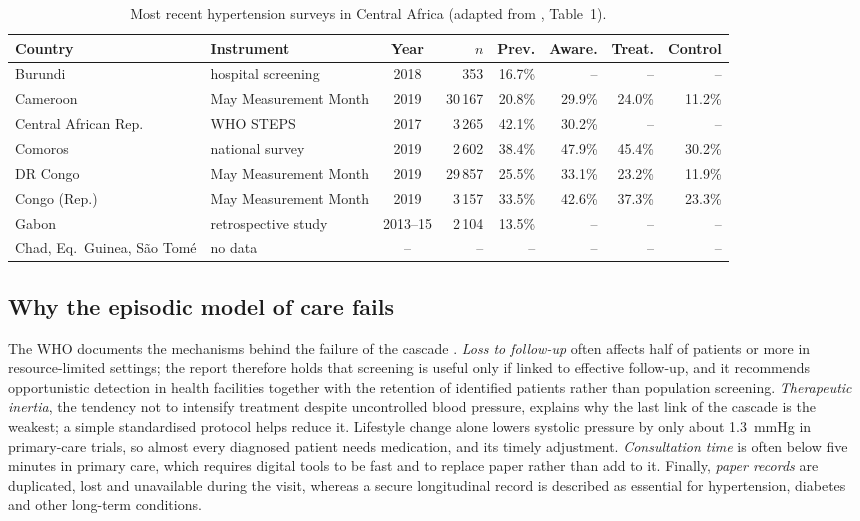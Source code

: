 \documentclass[11pt,a4paper,oneside]{report}
\begin{document}
\begin{table}[htbp]
\centering\footnotesize
\caption{Most recent hypertension surveys in Central Africa (adapted from \cite{gafane2024}, Table~1).}\label{tab:central-africa}
\begin{tabularx}{\textwidth}{@{}l >{\raggedright\arraybackslash}X c r r r r r@{}}
\toprule
\textbf{Country} & \textbf{Instrument} & \textbf{Year} & \textbf{$n$} & \textbf{Prev.} & \textbf{Aware.} & \textbf{Treat.} & \textbf{Control} \\
\midrule
Burundi & hospital screening & 2018 & 353 & 16.7\% & -- & -- & -- \\
Cameroon & May Measurement Month & 2019 & 30\,167 & 20.8\% & 29.9\% & 24.0\% & 11.2\% \\
Central African Rep. & WHO STEPS & 2017 & 3\,265 & 42.1\% & 30.2\% & -- & -- \\
Comoros & national survey & 2019 & 2\,602 & 38.4\% & 47.9\% & 45.4\% & 30.2\% \\
DR Congo & May Measurement Month & 2019 & 29\,857 & 25.5\% & 33.1\% & 23.2\% & 11.9\% \\
Congo (Rep.) & May Measurement Month & 2019 & 3\,157 & 33.5\% & 42.6\% & 37.3\% & 23.3\% \\
Gabon & retrospective study & 2013--15 & 2\,104 & 13.5\% & -- & -- & -- \\
Chad, Eq.\ Guinea, S\~ao Tom\'e & no data & -- & -- & -- & -- & -- & -- \\
\bottomrule
\end{tabularx}
\end{table}

\subsection{Why the episodic model of care fails}\label{sec:ltfu}\label{sec:inertia}

The WHO documents the mechanisms behind the failure of the cascade \parencite{who2023hypertension}. \emph{Loss to follow-up} often affects half of patients or more in resource-limited settings; the report therefore holds that screening is useful only if linked to effective follow-up, and it recommends opportunistic detection in health facilities together with the retention of identified patients rather than population screening. \emph{Therapeutic inertia}, the tendency not to intensify treatment despite uncontrolled blood pressure, explains why the last link of the cascade is the weakest; a simple standardised protocol helps reduce it. Lifestyle change alone lowers systolic pressure by only about 1.3~mmHg in primary-care trials, so almost every diagnosed patient needs medication, and its timely adjustment. \emph{Consultation time} is often below five minutes in primary care, which requires digital tools to be fast and to replace paper rather than add to it. Finally, \emph{paper records} are duplicated, lost and unavailable during the visit, whereas a secure longitudinal record is described as essential for hypertension, diabetes and other long-term conditions.
\end{document}
